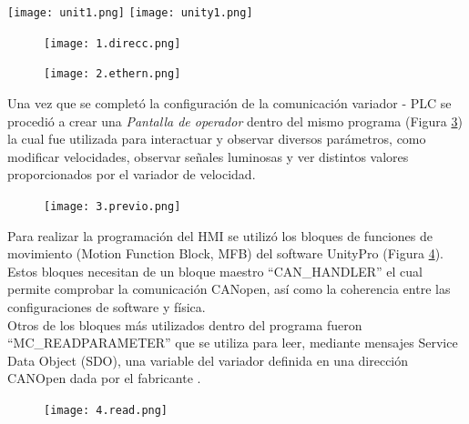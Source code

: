 \begin{center}
	\texttt{[image: unit1.png]}
	\label{fig:uni1}
	\texttt{[image: unity1.png]}
	\label{fig:uni0}
\end{center}

\begin{figure}[h]
	\centering
	\texttt{[image: 1.direcc.png]}
	\label{fig:direcc}
\end{figure}


\begin{figure}[h]
	\centering
	\texttt{[image: 2.ethern.png]}
	\label{fig:inter}
\end{figure}

Una vez que se completó la configuración de la comunicación variador - PLC se procedió a crear una \textit{Pantalla de operador} dentro del mismo programa (Figura \ref{fig:previo})
la cual fue utilizada para interactuar y observar diversos parámetros, como modificar velocidades, observar señales luminosas y ver distintos valores proporcionados por el variador de velocidad.
 
\begin{figure}[H]
	\centering
	\texttt{[image: 3.previo.png]}
	\label{fig:previo}
\end{figure}

Para realizar la programación del HMI se utilizó los bloques de funciones de movimiento (Motion Function Block, MFB) del software UnityPro (Figura \ref{fig:read}). Estos bloques necesitan de un bloque maestro ``CAN\_HANDLER'' el cual permite comprobar la comunicación CANopen, así como la coherencia
entre las configuraciones de software y física.
\\
Otros de los bloques más utilizados dentro del programa fueron ``MC\_READPARAMETER'' que se utiliza para leer, mediante mensajes Service Data Object
(SDO), una variable del variador definida en una dirección CANOpen dada por el fabricante \cite{ComManual}.

\begin{figure}[H]
	\centering
	\texttt{[image: 4.read.png]}
	\label{fig:read}
\end{figure}



